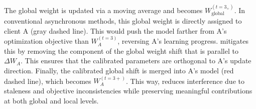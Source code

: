 The global weight is updated via a moving average and becomes $W^{(t=3_+)}_\text{global}$. In conventional asynchronous methods, this global weight is directly assigned to client A (gray dashed line). This would push the model farther from A's optimization objective than $W^{(t=3)}_A$, reversing A's learning progress. \our mitigates this by removing the component of the global weight shift that is parallel to $\Delta W_A$. This ensures that the calibrated parameters are orthogonal to A's update direction. Finally, the calibrated global shift is merged into A's model (red dashed line), which becomes $W^{(t=3+)}_A$. This way, \our reduces interference due to staleness and objective inconsistencies while preserving meaningful contributions at both global and local levels. 